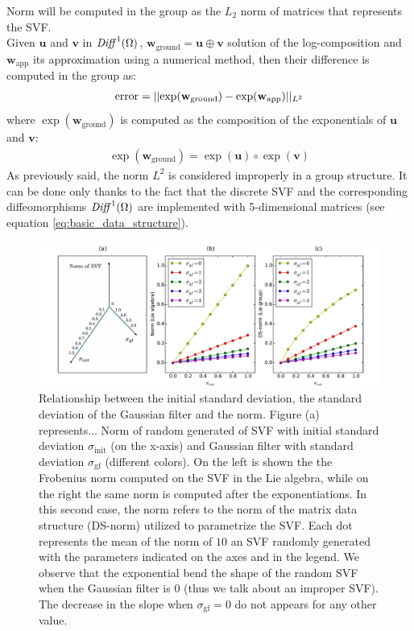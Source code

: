 Norm will be computed in the group as the $L_2$ norm of matrices that represents the SVF. \\ 
Given $\mathbf{u}$ and $\mathbf{v}$ in $\text{\emph{Diff}}^{1}(\Omega)$, $\mathbf{w}_{\text{ground}} = \mathbf{u}\oplus \mathbf{v}$ solution of the log-composition and $\mathbf{w}_{\text{app}}$ its approximation using a numerical method, then their difference is computed in the group as:
\begin{align*}
\text{error} = \vert\lvert \exp(\mathbf{w}_{\text{ground}}) - \exp(\mathbf{w}_{\text{app}}) \rvert\vert_{L^{2}}
\end{align*}
where $\exp(\mathbf{w}_{\text{ground}})$ is computed as the composition of the exponentials of $\mathbf{u}$ and $\mathbf{v}$:
\begin{align*}
\exp(\mathbf{w}_{\text{ground}}) = \exp(\mathbf{u})\circ \exp(\mathbf{v})
\end{align*}
As previously said, the norm $L^2$ is considered improperly in a group structure. It can be done only thanks to the fact that the discrete SVF and the corresponding diffeomorphisms $\text{\emph{Diff}}^{1}(\Omega)$ are implemented with 5-dimensional matrices (see equation \ref{eq:basic_data_structure}).




\begin{figure}[!ht]
	\hspace{-1cm}
	\includegraphics[scale=0.51]{figures/SVF_sigma_means_comparisons.pdf}
	\caption{Relationship between the initial standard deviation, the standard deviation of the Gaussian filter and the norm. Figure (a) represents... Norm of random generated of SVF with initial standard deviation $\sigma_{\text{init}}$ (on the x-axis) and Gaussian filter with standard deviation $\sigma_{\text{gf}}$ (different colors). On the left is shown the the Frobenius norm computed on the SVF in the Lie algebra, while on the right the same norm is computed after the exponentiations. In this second case, the norm refers to the norm of the matrix data structure (DS-norm) utilized to parametrize the SVF. Each dot represents the mean of the norm of $10$ an SVF randomly generated with the parameters indicated on the axes and in the legend. We observe that the exponential bend the shape of the random SVF when the Gaussian filter is $0$ (thus we talk about an improper SVF). The decrease in the slope when $\sigma_{\text{gf}}=0$ do not appears for any other value.}
	\label{fig:SVF_sigma_means_comparisons}
\end{figure}



